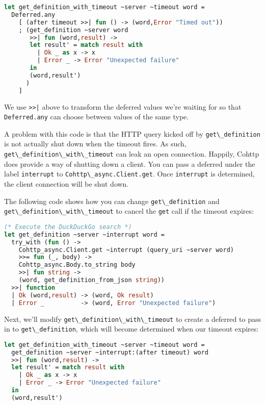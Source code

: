 \begin{lstlisting}[language=Caml]
let get_definition_with_timeout ~server ~timeout word =
  Deferred.any
    [ (after timeout >>| fun () -> (word,Error "Timed out"))
    ; (get_definition ~server word
       >>| fun (word,result) ->
       let result' = match result with
         | Ok _ as x -> x
         | Error _ -> Error "Unexpected failure"
       in
       (word,result')
      )
    ]
\end{lstlisting}

We use \passthrough{\lstinline!>>|!} above to transform the deferred
values we're waiting for so that \passthrough{\lstinline!Deferred.any!}
can choose between values of the same type.

A problem with this code is that the HTTP query kicked off by
\passthrough{\lstinline!get\_definition!} is not actually shut down when
the timeout fires. As such,
\passthrough{\lstinline!get\_definition\_with\_timeout!} can leak an
open connection. Happily, Cohttp does provide a way of shutting down a
client. You can pass a deferred under the label
\passthrough{\lstinline!interrupt!} to
\passthrough{\lstinline!Cohttp\_async.Client.get!}. Once
\passthrough{\lstinline!interrupt!} is determined, the client connection
will be shut down.

The following code shows how you can change
\passthrough{\lstinline!get\_definition!} and
\passthrough{\lstinline!get\_definition\_with\_timeout!} to cancel the
\passthrough{\lstinline!get!} call if the timeout expires:

\begin{lstlisting}[language=Caml]
(* Execute the DuckDuckGo search *)
let get_definition ~server ~interrupt word =
  try_with (fun () ->
    Cohttp_async.Client.get ~interrupt (query_uri ~server word)
    >>= fun (_, body) ->
    Cohttp_async.Body.to_string body
    >>| fun string ->
    (word, get_definition_from_json string))
  >>| function
  | Ok (word,result) -> (word, Ok result)
  | Error _          -> (word, Error "Unexpected failure")
\end{lstlisting}

Next, we'll modify
\passthrough{\lstinline!get\_definition\_with\_timeout!} to create a
deferred to pass in to \passthrough{\lstinline!get\_definition!}, which
will become determined when our timeout expires:

\begin{lstlisting}[language=Caml]
let get_definition_with_timeout ~server ~timeout word =
  get_definition ~server ~interrupt:(after timeout) word
  >>| fun (word,result) ->
  let result' = match result with
    | Ok _ as x -> x
    | Error _ -> Error "Unexpected failure"
  in
  (word,result')
\end{lstlisting}

